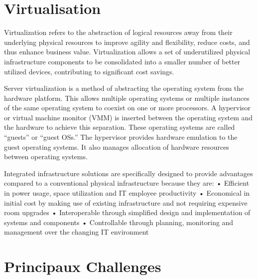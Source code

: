 \section{Virtualisation}

Virtualization refers to the abstraction of logical resources away from their underlying physical resources to improve agility and flexibility, reduce costs, and thus enhance business value. Virtualization allows a set of underutilized physical infrastructure components to be consolidated into a smaller number of better utilized devices, contributing to significant cost savings.

Server virtualization is a method of abstracting the operating system from the hardware platform. This allows multiple operating systems or multiple instances of the same operating system to coexist on one or more processors. A hypervisor or virtual machine monitor (VMM) is inserted between the operating system and the hardware to achieve this separation. These operating systems are called “guests” or “guest OSs.” The hypervisor provides hardware emulation to the guest operating systems. It also manages allocation of hardware resources between operating systems.


Integrated infrastructure solutions are specifically designed to provide advantages compared to a conventional physical infrastructure because they are: 
•	 Efficient in power usage, space utilization and IT employee productivity
•	 Economical in initial cost by making use of existing infrastructure and not requiring expensive room upgrades
•	 Interoperable through simplified design and implementation of systems and components 
•	 Controllable through planning, monitoring and management over the changing IT environment


\section{Principaux Challenges}



